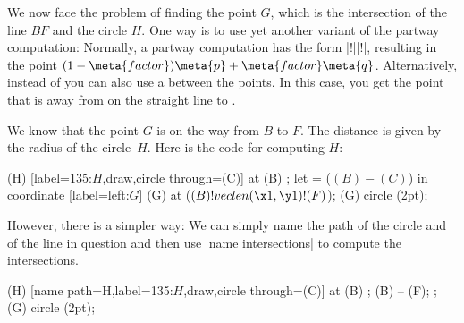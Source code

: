 \begin{paracol}{2}
We now face the problem of finding the point $G$, which is the intersection of
the line $BF$ and the circle $H$. One way is to use yet another variant of the
partway computation: Normally, a partway computation has the form
|!||!|, resulting in the point
$(1-\meta{factor})\meta{p} + \meta{factor}\meta{q}$. Alternatively, instead of
 you can also use a  between the points. In this
case, you get the point that is  away from  on the
straight line to .

We know that the point $G$ is on the way from $B$ to $F$. The distance is given
by the radius of the circle~$H$. Here is the code for computing $H$:
%
{\ifpgfmanualexternalize\tikzexternaldisable\fi
\begin{codeexample}[
    preamble={\usetikzlibrary{calc,through}},
    pre={\begin{tikzpicture}
  \coordinate [label=left:$A$]  (A) at (0,0);
  \coordinate [label=right:$B$] (B) at (0.75,0.25);
  \coordinate [label=above:$C$] (C) at (1,1.5);
  \draw (A) -- (B) -- (C);
  \coordinate [label=above:$D$] (D) at
    ($ (A) ! .5 ! (B) ! {sin(60)*2} ! 90:(B) $) {};
  \draw (D) -- ($ (D) ! 3.5 ! (B) $) coordinate [label=below:$F$] (F);
  \draw (D) -- ($ (D) ! 2.5 ! (A) $) coordinate [label=below:$E$] (E);},
    post={\end{tikzpicture}},
]
  \node (H) [label=135:$H$,draw,circle through=(C)] at (B) {};
  \path let  = ($ (B) - (C) $) in
    coordinate [label=left:$G$] (G) at ($ (B) ! veclen(\x1,\y1) ! (F) $);
  \fill[red,opacity=.5] (G) circle (2pt);
\end{codeexample}

However, there is a simpler way: We can simply name the path of the circle and
of the line in question and then use |name intersections| to compute the
intersections.
%
\begin{codeexample}[
    preamble={\usetikzlibrary{calc,intersections,through}},
    pre={\begin{tikzpicture}
  \coordinate [label=left:$A$]  (A) at (0,0);
  \coordinate [label=right:$B$] (B) at (0.75,0.25);
  \coordinate [label=above:$C$] (C) at (1,1.5);
  \draw (A) -- (B) -- (C);
  \coordinate [label=above:$D$] (D) at
    ($ (A) ! .5 ! (B) ! {sin(60)*2} ! 90:(B) $) {};
  \draw (D) -- ($ (D) ! 3.5 ! (B) $) coordinate [label=below:$F$] (F);
  \draw (D) -- ($ (D) ! 2.5 ! (A) $) coordinate [label=below:$E$] (E);},
    post={\end{tikzpicture}},
]
  \node (H) [name path=H,label=135:$H$,draw,circle through=(C)] at (B) {};
  \path [name path=B--F] (B) -- (F);
  \path [name intersections={of=H and B--F,by={[label=left:$G$]G}}];
  \fill[red,opacity=.5] (G) circle (2pt);
\end{codeexample}
}%



\end{paracol}
